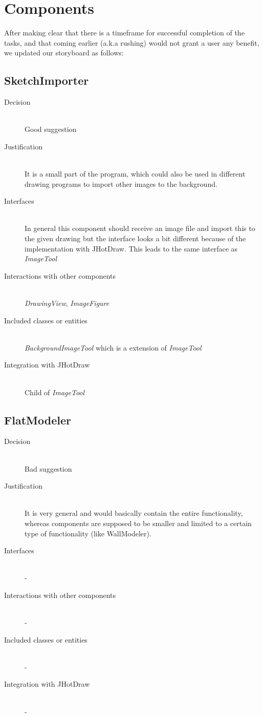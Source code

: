 \section{Components}

After making clear that there is a timeframe for successful completion of the tasks, and that coming earlier (a.k.a rushing) would not grant a user any benefit, we updated our storyboard as follows:

\subsection{SketchImporter}
	\begin{description}
		\item[Decision] \hfill \\ Good suggestion
		\item[Justification] \hfill \\ It is a small part of the program, which could also be used in different drawing programs to import other images to the background.
		\item[Interfaces] \hfill \\ In general this component should receive an image file and import this to the given drawing but the interface looks a bit different because of the implementation with JHotDraw. This leads to the same interface as \textit{ImageTool}
		\item[Interactions with other components] \hfill \\ \textit{DrawingView}, \textit{ImageFigure}
		\item[Included classes or entities] \hfill \\ \textit{BackgroundImageTool} which is a extension of \textit{ImageTool}
		\item[Integration with JHotDraw] \hfill \\ Child of \textit{ImageTool}
	\end{description}

\subsection{FlatModeler}
	\begin{description}
		\item[Decision] \hfill \\ Bad suggestion
		\item[Justification] \hfill \\ It is very general and would basically contain the entire functionality, whereas components are supposed to be smaller and limited to a certain type of functionality (like WallModeler).
		\item[Interfaces] \hfill \\ -
		\item[Interactions with other components] \hfill \\ -
		\item[Included classes or entities] \hfill \\ -
		\item[Integration with JHotDraw] \hfill \\ -
	\end{description}

